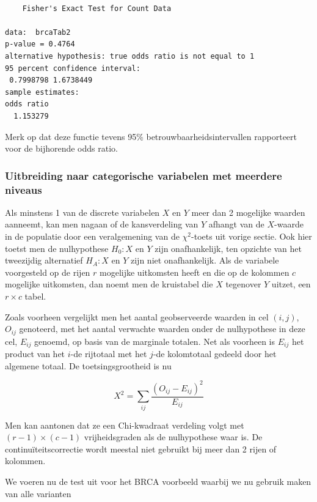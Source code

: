 \documentclass[
  dutch,
  letterpaper,
  12pt]{book}
\theoremstyle{definition}
\theoremstyle{definition}
\theoremstyle{definition}
\theoremstyle{remark}
\begin{document}
\begin{verbatim}

    Fisher's Exact Test for Count Data

data:  brcaTab2
p-value = 0.4764
alternative hypothesis: true odds ratio is not equal to 1
95 percent confidence interval:
 0.7998798 1.6738449
sample estimates:
odds ratio 
  1.153279 
\end{verbatim}

Merk op dat deze functie tevens 95\% betrouwbaarheidsintervallen
rapporteert voor de bijhorende odds ratio.

\subsubsection{Uitbreiding naar categorische variabelen met meerdere
niveaus}\label{uitbreiding-naar-categorische-variabelen-met-meerdere-niveaus}

Als minstens 1 van de discrete variabelen \(X\) en \(Y\) meer dan 2
mogelijke waarden aanneemt, kan men nagaan of de kansverdeling van \(Y\)
afhangt van de \(X\)-waarde in de populatie door een veralgemening van
de \(\chi^2\)-toets uit vorige sectie. Ook hier toetst men de
nulhypothese \(H_0: X\) en \(Y\) zijn onafhankelijk, ten opzichte van
het tweezijdig alternatief \(H_A: X\) en \(Y\) zijn niet onafhankelijk.
Als de variabele voorgesteld op de rijen \(r\) mogelijke uitkomsten
heeft en die op de kolommen \(c\) mogelijke uitkomsten, dan noemt men de
kruistabel die \(X\) tegenover \(Y\) uitzet, een \(r \times c\) tabel.

Zoals voorheen vergelijkt men het aantal geobserveerde waarden in cel
\((i,j)\), \(O_{ij}\) genoteerd, met het aantal verwachte waarden onder
de nulhypothese in deze cel, \(E_{ij}\) genoemd, op basis van de
marginale totalen. Net als voorheen is \(E_{ij}\) het product van het
\(i\)-de rijtotaal met het \(j\)-de kolomtotaal gedeeld door het
algemene totaal. De toetsingsgrootheid is nu

\begin{equation*}
X^2 = \sum_{ij} \frac{\left (O_{ij} - E_{ij}\right)^2 }{ E_{ij}}
\end{equation*}

Men kan aantonen dat ze een Chi-kwadraat verdeling volgt met
\((r-1) \times
(c-1)\) vrijheidsgraden als de nulhypothese waar is. De
continuïteitscorrectie wordt meestal niet gebruikt bij meer dan 2 rijen
of kolommen.

We voeren nu de test uit voor het BRCA voorbeeld waarbij we nu gebruik
maken van alle varianten
\end{document}
